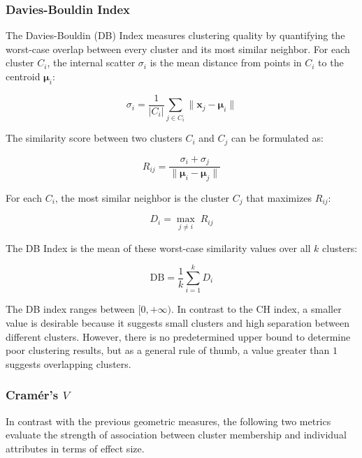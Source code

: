 \subsubsection*{Davies-Bouldin Index}

The Davies-Bouldin (DB) Index \cite{davies1979} measures clustering quality by quantifying the worst-case overlap between every cluster and its most similar neighbor. For each cluster $C_i$, the internal scatter $\sigma_i$ is the mean distance from points in $C_i$ to the centroid $\boldsymbol{\mu}_i$:

\begin{equation}
    \sigma_i = \frac{1}{|C_i|} \sum_{j \in C_i} \|\mathbf{x}_j - \boldsymbol{\mu}_i\|
    \label{eq:db_sigma}
\end{equation}

The similarity score between two clusters $C_i$ and $C_j$ can be formulated as:

\begin{equation}
    R_{ij} = \frac{\sigma_i + \sigma_j}{\|\boldsymbol{\mu}_i - \boldsymbol{\mu}_j\|}
    \label{eq:db_Rij}
\end{equation}

For each $C_i$, the most similar neighbor is the cluster $C_j$ that maximizes $R_{ij}$:

\begin{equation}
    D_i = \max_{j \neq i}\; R_{ij}
    \label{eq:db_Di}
\end{equation}

The DB Index is the mean of these worst-case similarity values over all $k$ clusters:

\begin{equation}
    \mathrm{DB} = \frac{1}{k} \sum_{i=1}^{k} D_i
    \label{eq:db}
\end{equation}

The DB index ranges between $[0, +\infty)$. In contrast to the CH index, a smaller value is desirable because it suggests small clusters and high separation between different clusters. However, there is no predetermined upper bound to determine poor clustering results, but as a general rule of thumb, a value greater than $1$ suggests overlapping clusters.

\subsubsection*{Cramér's $V$}

In contrast with the previous geometric measures, the following two metrics evaluate the strength of association between cluster membership and individual attributes in terms of effect size.

